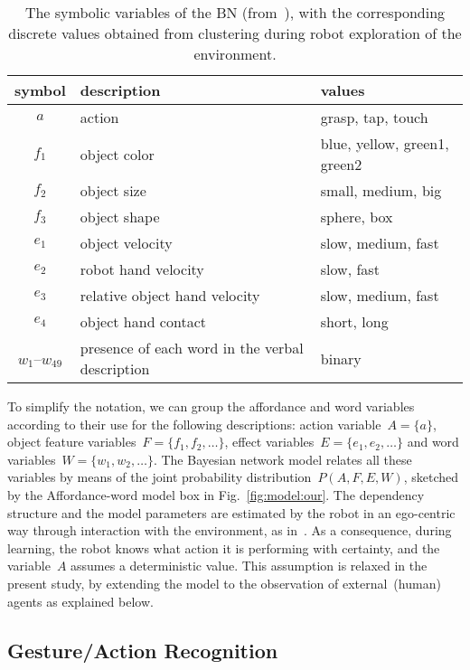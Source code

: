 \begin{table}
    \centering
    \caption{The symbolic variables of the \acl{BN} (from~\cite{salvi:2012:smcb}), with the corresponding discrete values obtained from clustering during robot exploration of the environment.}
    \label{tab:bnsymb}
    \begin{tabular}{cp{3.3cm}l}
    \toprule
    symbol & description     & values \\
    \midrule
    $a$ & action          & grasp, tap, touch \\
    \midrule
    $f_1$ & object color   & blue, yellow, green1, green2 \\
    $f_2$ & object size     & small, medium, big \\
    $f_3$ & object shape    & sphere, box \\
    \midrule
    $e_1$ & object velocity & slow, medium, fast \\
    $e_2$ & robot hand velocity & slow, fast \\
    $e_3$ & relative object hand velocity & slow, medium, fast \\
    $e_4$ & object hand contact & short, long \\
    \midrule
    $w_1$--$w_{49}$ & presence of each word in the verbal description & binary \\
    \bottomrule
    \end{tabular}
\end{table}

To simplify the notation, we can group the affordance and word variables according to their use for the following descriptions: action variable~$A = \{a\}$, object feature variables~$F=\{f_1, f_2, \dots\}$, effect variables~$E=\{e_1, e_2, \dots\}$ and word variables~$W = \{w_1, w_2, \dots\}$.
The Bayesian network model relates all these variables by means of the joint probability distribution~$P(A, F, E, W)$, sketched by the Affordance-word model box in Fig.~\ref{fig:model:our}.
The dependency structure and the model parameters are estimated by the robot in an ego-centric way through interaction with the environment, as in~\cite{salvi:2012:smcb}.
As a consequence, during learning, the robot knows what action it is performing with certainty, and the variable~$A$ assumes a deterministic value. This assumption is relaxed in the present study, by extending the model to the observation of external~(human) agents as explained below.

\subsection{Gesture/Action Recognition}

